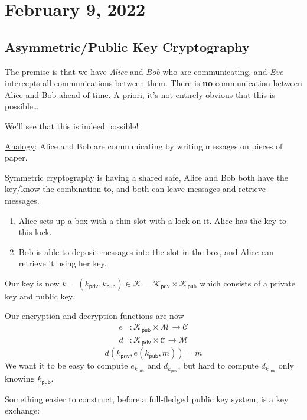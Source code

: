 \section{February 9, 2022}
\subsection{Asymmetric/Public Key Cryptography}
The premise is that we have \emph{Alice} and \emph{Bob} who are communicating, and \emph{Eve} intercepts \ul{all} communications between them. There is \textbf{no} communication between Alice and Bob ahead of time. A priori, it's not entirely obvious that this is possible\dots

We'll see that this is indeed possible!

\begin{example}
    \ul{Analogy}: Alice and Bob are communicating by writing messages on pieces of paper.

    Symmetric cryptography is having a shared safe, Alice and Bob both have the key/know the combination to, and both can leave messages and retrieve messages.

    \begin{enumerate}
        \item Alice sets up a box with a thin slot with a lock on it. Alice has the key to this lock.
        \item Bob is able to deposit messages into the slot in the box, and Alice can retrieve it using her key.
    \end{enumerate}
\end{example}

Our key is now $k = (k_\mathsf{priv}, k_\mathsf{pub})\in \mathcal{K} = \mathcal{K}_\mathsf{priv}\times \mathcal{K}_\mathsf{pub}$ which consists of a private key and public key.

Our encryption and decryption functions are now
\begin{align*}
    e & : \mathcal{K}_\mathsf{pub} \times \mathcal{M} \to \mathcal{C}  \\
    d & : \mathcal{K}_\mathsf{priv} \times \mathcal{C} \to \mathcal{M}
\end{align*}
\[d(k_\mathsf{priv}, e(k_\mathsf{pub}, m)) = m\]
We want it to be easy to compute $e_{k_\mathsf{pub}}$ and $d_{k_\mathsf{priv}}$, but hard to compute $d_{k_\mathsf{priv}}$ only knowing $k_\mathsf{pub}$.

Something easier to construct, before a full-fledged public key system, is a key exchange:
